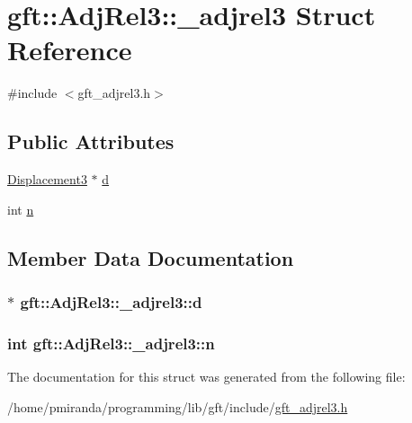 \hypertarget{structgft_1_1AdjRel3_1_1__adjrel3}{}\section{gft\+:\+:Adj\+Rel3\+:\+:\+\_\+adjrel3 Struct Reference}
\label{structgft_1_1AdjRel3_1_1__adjrel3}


{\ttfamily \#include $<$gft\+\_\+adjrel3.\+h$>$}

\subsection*{Public Attributes}
\begin{DoxyCompactItemize}
\item 
\hyperlink{namespacegft_1_1AdjRel3_a8939e0d3e5e0afd8c4e28e4b400de74e}{Displacement3} $\ast$ \hyperlink{structgft_1_1AdjRel3_1_1__adjrel3_acd7e5595a9288f4f7c73970ecb26e74d}{d}
\item 
int \hyperlink{structgft_1_1AdjRel3_1_1__adjrel3_a80640ea855cda065bb29facdfad616f9}{n}
\end{DoxyCompactItemize}


\subsection{Member Data Documentation}
\subsubsection[{\texorpdfstring{d}{d}}]{$\ast$ gft\+::\+Adj\+Rel3\+::\+\_\+adjrel3\+::d}\hypertarget{structgft_1_1AdjRel3_1_1__adjrel3_acd7e5595a9288f4f7c73970ecb26e74d}{}\label{structgft_1_1AdjRel3_1_1__adjrel3_acd7e5595a9288f4f7c73970ecb26e74d}
\subsubsection[{\texorpdfstring{n}{n}}]{\setlength{\rightskip}{0pt plus 5cm}int gft\+::\+Adj\+Rel3\+::\+\_\+adjrel3\+::n}\hypertarget{structgft_1_1AdjRel3_1_1__adjrel3_a80640ea855cda065bb29facdfad616f9}{}\label{structgft_1_1AdjRel3_1_1__adjrel3_a80640ea855cda065bb29facdfad616f9}


The documentation for this struct was generated from the following file\+:\begin{DoxyCompactItemize}
\item 
/home/pmiranda/programming/lib/gft/include/\hyperlink{gft__adjrel3_8h}{gft\+\_\+adjrel3.\+h}\end{DoxyCompactItemize}
